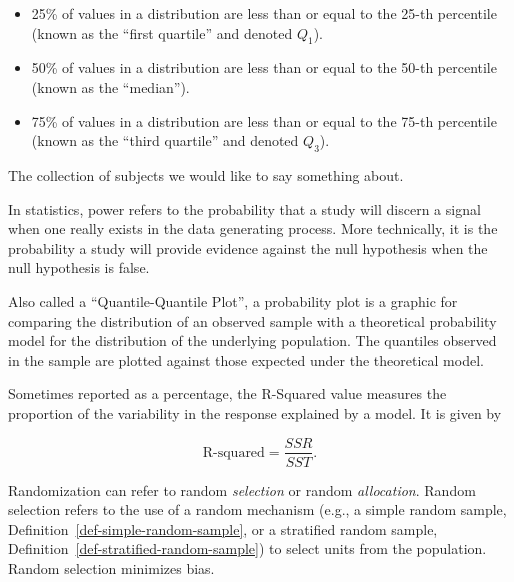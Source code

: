 \documentclass[
  letterpaper,
  DIV=11,
  numbers=noendperiod]{scrreprt}
\providecommand{\tightlist}{%
  \setlength{\itemsep}{0pt}\setlength{\parskip}{0pt}}\usepackage{longtable,booktabs,array}
\theoremstyle{definition}
\theoremstyle{definition}
\theoremstyle{plain}
\theoremstyle{remark}
\begin{document}
\begin{itemize}
\tightlist
\item
  25\% of values in a distribution are less than or equal to the 25-th
  percentile (known as the ``first quartile'' and denoted \(Q_1\)).
\item
  50\% of values in a distribution are less than or equal to the 50-th
  percentile (known as the ``median'').
\item
  75\% of values in a distribution are less than or equal to the 75-th
  percentile (known as the ``third quartile'' and denoted \(Q_3\)).
\end{itemize}

\begin{description}
\tightlist
\item[Population (Definition~\ref{def-population})]
The collection of subjects we would like to say something about.
\item[Power (Definition~\ref{def-power})]
In statistics, power refers to the probability that a study will discern
a signal when one really exists in the data generating process. More
technically, it is the probability a study will provide evidence against
the null hypothesis when the null hypothesis is false.
\item[Probability Plot (Definition~\ref{def-probability-plot})]
Also called a ``Quantile-Quantile Plot'', a probability plot is a
graphic for comparing the distribution of an observed sample with a
theoretical probability model for the distribution of the underlying
population. The quantiles observed in the sample are plotted against
those expected under the theoretical model.
\item[R-Squared (Definition~\ref{def-r-squared})]
Sometimes reported as a percentage, the R-Squared value measures the
proportion of the variability in the response explained by a model. It
is given by
\end{description}

\[\text{R-squared} = \frac{SSR}{SST}.\]

\begin{description}
\tightlist
\item[Randomization (Definition~\ref{def-randomization})]
Randomization can refer to random \emph{selection} or random
\emph{allocation}. Random selection refers to the use of a random
mechanism (e.g., a simple random sample,
Definition~\ref{def-simple-random-sample}, or a stratified random
sample, Definition~\ref{def-stratified-random-sample}) to select units
from the population. Random selection minimizes bias.
\end{description}
\end{document}

